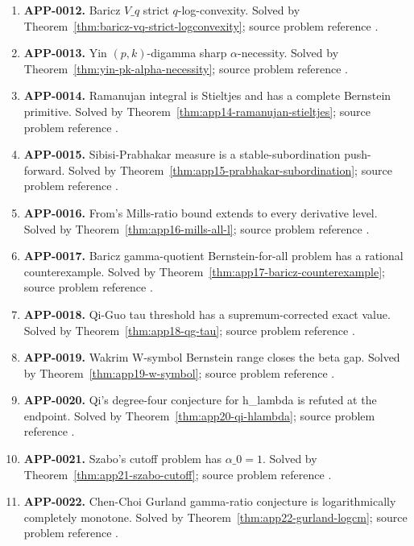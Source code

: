 \documentclass[11pt]{article}
\numberwithin{equation}{section}
\theoremstyle{definition}
\theoremstyle{remark}
\newcommand{\1}{\mathbf 1}
\begin{document}
\begin{enumerate}
\item \label{ledger:app-0012}\textbf{APP-0012.} Baricz \(V\_q\) strict \(q\)-log-convexity. Solved by Theorem~\ref{thm:baricz-vq-strict-logconvexity}; source problem reference \cite{baricz-turan-thesis}.
\item \label{ledger:app-0013}\textbf{APP-0013.} Yin \((p,k)\)-digamma sharp \(\alpha\)-necessity. Solved by Theorem~\ref{thm:yin-pk-alpha-necessity}; source problem reference \cite{yin-pk-digamma}.
\item \label{ledger:app-0014}\textbf{APP-0014.} Ramanujan integral is Stieltjes and has a complete Bernstein primitive. Solved by Theorem~\ref{thm:app14-ramanujan-stieltjes}; source problem reference \cite{mishra-swaminathan-ramanujan}.
\item \label{ledger:app-0015}\textbf{APP-0015.} Sibisi-Prabhakar measure is a stable-subordination push-forward. Solved by Theorem~\ref{thm:app15-prabhakar-subordination}; source problem reference \cite{sibisi-prabhakar}.
\item \label{ledger:app-0016}\textbf{APP-0016.} From's Mills-ratio bound extends to every derivative level. Solved by Theorem~\ref{thm:app16-mills-all-l}; source problem reference \cite{from-mills}.
\item \label{ledger:app-0017}\textbf{APP-0017.} Baricz gamma-quotient Bernstein-for-all problem has a rational counterexample. Solved by Theorem~\ref{thm:app17-baricz-counterexample}; source problem reference \cite{baricz-turan}.
\item \label{ledger:app-0018}\textbf{APP-0018.} Qi-Guo tau threshold has a supremum-corrected exact value. Solved by Theorem~\ref{thm:app18-qg-tau}; source problem reference \cite{qi-guo-2004}.
\item \label{ledger:app-0019}\textbf{APP-0019.} Wakrim W-symbol Bernstein range closes the beta gap. Solved by Theorem~\ref{thm:app19-w-symbol}; source problem reference \cite{wakrim-w}.
\item \label{ledger:app-0020}\textbf{APP-0020.} Qi's degree-four conjecture for h\_lambda is refuted at the endpoint. Solved by Theorem~\ref{thm:app20-qi-hlambda}; source problem reference \cite{qi-hlambda}.
\item \label{ledger:app-0021}\textbf{APP-0021.} Szabo's cutoff problem has \(\alpha\_0=1\). Solved by Theorem~\ref{thm:app21-szabo-cutoff}; source problem reference \cite{szabo-cm}.
\item \label{ledger:app-0022}\textbf{APP-0022.} Chen-Choi Gurland gamma-ratio conjecture is logarithmically completely monotone. Solved by Theorem~\ref{thm:app22-gurland-logcm}; source problem reference \cite{chen-choi-gurland}.

\end{enumerate}
\end{document}
